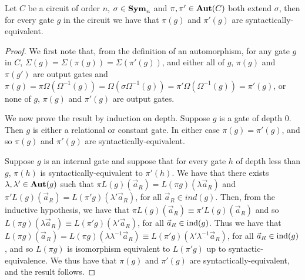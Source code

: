 \documentclass[../paper.tex]{subfiles}
\begin{document}
\begin{lem}
  Let $C$ be a circuit of order $n$, $\sigma \in \text{\textbf{Sym}}_n$ and $\pi, \pi' \in
  \text{\textbf{Aut}}(C)$ both extend $\sigma$, then for every gate $g$ in the circuit we have
  that $\pi (g)$ and $\pi'(g)$ are syntactically-equivalent.
  \label{lem:permutation-extending-syntactic-equivalence}
\end{lem}
\begin{proof}
  We first note that, from the definition of an automorphism, for any gate $g$
  in $C$, $\Sigma (g) = \Sigma (\pi (g)) = \Sigma (\pi' (g))$, and either all of
  $g$, $\pi (g)$ and $\pi (g')$ are output gates and $\pi (g) = \pi \Omega
  (\Omega^{-1}(g)) = \Omega (\sigma \Omega^{-1}(g)) = \pi' \Omega
  (\Omega^{-1}(g)) = \pi'(g)$, or none of $g$, $\pi(g)$ and $\pi' (g)$ are output
  gates.
  
  We now prove the result by induction on depth. Suppose $g$ is a gate of depth
  $0$. Then $g$ is either a relational or constant gate. In either case $\pi (g)
  = \pi' (g)$, and so $\pi(g)$ and $\pi'(g)$ are syntactically-equivalent.

  Suppose $g$ is an internal gate and suppose that for every gate $h$ of depth
  less than $g$, $\pi (h)$ is syntactically-equivalent to $\pi'(h)$. We have
  that there exists $\lambda, \lambda' \in \text{\textbf{Aut}}(g)$ such that $\pi
  L(g)(\vec{a}_R) = L(\pi g) (\lambda \vec{a}_R)$ and $\pi' L(g)(\vec{a}_R) =
  L(\pi' g)(\lambda' \vec{a}_R)$, for all $\vec{a}_R \in ind(g)$. Then, from the
  inductive hypothesis, we have that $\pi L(g)(\vec{a}_R) \equiv \pi
  'L(g)(\vec{a}_R)$ and so $L(\pi g)(\lambda \vec{a}_R) \equiv L(\pi' g)
  (\lambda' \vec{a}_R)$, for all $\vec{a}_R \in \text{\upshape ind}(g)$. Thus we have that
  $L(\pi g) (\vec{a}_R) = L (\pi g) (\lambda \lambda^{-1}\vec{a}_R) \equiv
  L(\pi' g) (\lambda' \lambda^{-1}\vec{a}_R)$, for all $\vec{a}_R \in \text{\upshape ind}(g)$,
  and so $L(\pi g)$ is isomorphism equivalent to $L(\pi'g)$ up to
  syntactic-equivalence. We thus have that $\pi (g) $ and $\pi' (g)$ are
  syntactically-equivalent, and the result follows.

  
\end{proof}
\end{document}
